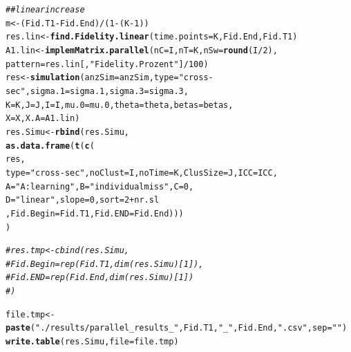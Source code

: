 \documentclass{article}\usepackage[]{graphicx}\usepackage[]{color}
\makeatletter
\newcommand{\hlnum}[1]{\textcolor[rgb]{0.686,0.059,0.569}{#1}}%
\newcommand{\hlstr}[1]{\textcolor[rgb]{0.192,0.494,0.8}{#1}}%
\newcommand{\hlcom}[1]{\textcolor[rgb]{0.678,0.584,0.686}{\textit{#1}}}%
\newcommand{\hlopt}[1]{\textcolor[rgb]{0,0,0}{#1}}%
\newcommand{\hlstd}[1]{\textcolor[rgb]{0.345,0.345,0.345}{#1}}%
\newcommand{\hlkwb}[1]{\textcolor[rgb]{0.69,0.353,0.396}{#1}}%
\newcommand{\hlkwc}[1]{\textcolor[rgb]{0.333,0.667,0.333}{#1}}%
\newcommand{\hlkwd}[1]{\textcolor[rgb]{0.737,0.353,0.396}{\textbf{#1}}}%
\newenvironment{kframe}{%
 \def\at@end@of@kframe{}%
 \ifinner\ifhmode%
  \def\at@end@of@kframe{\end{minipage}}%
  \begin{minipage}{\columnwidth}%
 \fi\fi%
 \def\FrameCommand##1{\hskip\@totalleftmargin \hskip-\fboxsep
 \colorbox{shadecolor}{##1}\hskip-\fboxsep
     \hskip-\linewidth \hskip-\@totalleftmargin \hskip\columnwidth}%
 \MakeFramed {\advance\hsize-\width
   \@totalleftmargin\z@ \linewidth\hsize
   \@setminipage}}%
 {\par\unskip\endMakeFramed%
 \at@end@of@kframe}
\newenvironment{knitrout}{}{} %
\makeatother
\begin{document}
\begin{knitrout}
\begin{kframe}
{\ttfamily\noindent\color{warningcolor}{\#\# Warning in optwrap(optimizer, devfun, x@theta, lower = x@lower, calc.derivs = TRUE, : convergence code 3 from bobyqa: bobyqa -- a trust region step failed to reduce q}}\begin{alltt}
\hlcom{##linear increase}
\hlstd{m}\hlkwb{<-}\hlstd{(Fid.T1}\hlopt{-}\hlstd{Fid.End)}\hlopt{/}\hlstd{(}\hlnum{1}\hlopt{-}\hlstd{(K}\hlopt{-}\hlnum{1}\hlstd{))}
\hlstd{res.lin}\hlkwb{<-}\hlkwd{find.Fidelity.linear}\hlstd{(}\hlkwc{time.points}\hlstd{=K, Fid.End, Fid.T1)}
\hlstd{A1.lin} \hlkwb{<-}\hlkwd{implemMatrix.parallel}\hlstd{(}\hlkwc{nC}\hlstd{=I,} \hlkwc{nT}\hlstd{=K,} \hlkwc{nSw}\hlstd{=}\hlkwd{round}\hlstd{(I}\hlopt{/}\hlnum{2}\hlstd{),}
                               \hlkwc{pattern}\hlstd{=res.lin[,}\hlstr{"Fidelity.Prozent"}\hlstd{]}\hlopt{/}\hlnum{100}\hlstd{)}
\hlstd{res}\hlkwb{<-}\hlkwd{simulation}\hlstd{(}\hlkwc{anzSim}\hlstd{=anzSim,}\hlkwc{type}\hlstd{=}\hlstr{"cross-sec"}\hlstd{,} \hlkwc{sigma.1}\hlstd{=sigma.1,}\hlkwc{sigma.3}\hlstd{=sigma.3,}
                     \hlkwc{K}\hlstd{=K,}\hlkwc{J}\hlstd{=J,}\hlkwc{I}\hlstd{=I,}\hlkwc{mu.0}\hlstd{=mu.0,} \hlkwc{theta}\hlstd{=theta,}\hlkwc{betas}\hlstd{=betas,}
                     \hlkwc{X}\hlstd{=X,} \hlkwc{X.A}\hlstd{=A1.lin)}
\hlstd{res.Simu}\hlkwb{<-}\hlkwd{rbind}\hlstd{(res.Simu,}
                  \hlkwd{as.data.frame}\hlstd{(}\hlkwd{t}\hlstd{(}\hlkwd{c}\hlstd{(}
                    \hlstd{res,}
                    \hlkwc{type}\hlstd{=}\hlstr{"cross-sec"}\hlstd{,} \hlkwc{noClust}\hlstd{=I,} \hlkwc{noTime}\hlstd{=K,} \hlkwc{ClusSize}\hlstd{=J,}  \hlkwc{ICC}\hlstd{=ICC,}
                    \hlkwc{A}\hlstd{=}\hlstr{"A: learning"}\hlstd{,} \hlkwc{B}\hlstd{=}\hlstr{"individual miss"}\hlstd{,} \hlkwc{C}\hlstd{=}\hlnum{0}\hlstd{,}
                    \hlkwc{D}\hlstd{=}\hlstr{"linear"}\hlstd{,} \hlkwc{slope}\hlstd{=}\hlnum{0}\hlstd{,} \hlkwc{sort}\hlstd{=}\hlnum{2}\hlopt{+}\hlstd{nr.sl}
                    \hlstd{,} \hlkwc{Fid.Begin}\hlstd{=Fid.T1,} \hlkwc{Fid.END}\hlstd{=Fid.End)))}
\hlstd{)}


\hlcom{# res.tmp<-cbind(res.Simu,}
\hlcom{#                Fid.Begin=rep(Fid.T1, dim(res.Simu)[1]), }
\hlcom{#                Fid.END=rep(Fid.End, dim(res.Simu)[1])}
\hlcom{#                )}

\hlstd{file.tmp}\hlkwb{<-}\hlkwd{paste}\hlstd{(}\hlstr{"./results/parallel_results_"}\hlstd{, Fid.T1,} \hlstr{"_"}\hlstd{, Fid.End,} \hlstr{".csv"}\hlstd{,} \hlkwc{sep}\hlstd{=}\hlstr{""}\hlstd{)}
\hlkwd{write.table}\hlstd{(res.Simu,} \hlkwc{file}\hlstd{=file.tmp)}


\end{alltt}
\end{kframe}
\end{knitrout}
\end{document}
